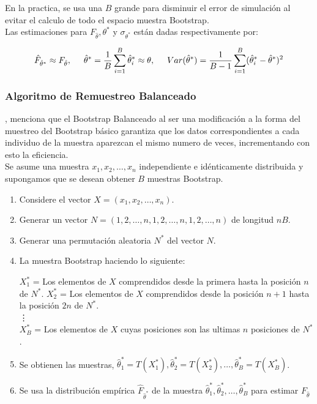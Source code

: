 En la practica, se usa una $B$ grande para disminuir el error de simulación al evitar el calculo de todo el espacio muestra Bootstrap.\\

Las estimaciones para  $F_{\hat{\theta}}, \theta^{*}$ y $ \sigma_{\theta^{*}} $ están dadas respectivamente por:

\[
\hat{F}_{\hat{\theta}^{*}} \approx F_{\hat{\theta}}, 
\hspace{.5cm} \hat{\theta}^{*} = \frac{1}{B} \sum_{i=1}^{B}  \hat{\theta}^{*}_{i} \approx \theta,
\hspace{.5cm} Var(\hat{\theta}^{*}) = \frac{1}{B-1} \sum_{i=1}^{B}(\hat{\theta}^{*}_{i}-\hat{\theta}^{*})^2
\]




\subsubsection{Algoritmo de Remuestreo Balanceado \parencite{balam-2012}}
\textcite{balam-2012}, menciona que el Bootstrap Balanceado al ser una modificación a la forma del muestreo del Bootstrap básico garantiza que los datos correspondientes a cada individuo de la muestra aparezcan el mismo numero de veces, incrementando con esto la eficiencia.\\

Se asume una muestra  $ x_{1}, x_{2},  \dots,  x_{n}$ independiente e idénticamente distribuida y supongamos que se desean obtener $B$ muestras Bootstrap.

\begin{enumerate}
	\item  Considere el vector $ X=(x_{1}, x_{2},  \dots,  x_{n}) $.
	
	\item  Generar un vector $ N= (1,2,\dots,n,1,2,\dots,n,1,2,\dots,n)$ de longitud $nB$.
	
	\item Generar una permutación aleatoria $N^{*}$ del vector $N$.
	
	\item La muestra Bootstrap haciendo lo siguiente:
	
	$X^{*}_{1}$ =  Los elementos de $X$ comprendidos desde la primera hasta la posición $n$ de $N^{*}$.\linebreak
	$X^{*}_{2}$ =  Los elementos de $X$ comprendidos desde la posición $n + 1$ hasta la posición $2n$ de $N^{*}$.\\
	\vdots\\
	$X^{*}_{B}$ =  Los elementos de $X$  cuyas posiciones son las ultimas $n$ posiciones de $N^{*}$.
	
	\item  Se obtienen las muestras, $\hat{\theta}^{*}_{1} =T (X^{*}_{1}), \hat{\theta}^{*}_{2} =T (X^{*}_{2}), \dots, \hat{\theta}^{*}_{B} =T (X^{*}_{B})$.
	
	\item  Se usa la distribución empírica $\hat{F}_{\hat{\theta}^{*}}$ de la muestra $\hat{\theta}^{*}_{1},\hat{\theta}^{*}_{2}, \dots, \hat{\theta}^{*}_{B}$ para estimar $F_{\hat{\theta}}$
	
\end{enumerate}



